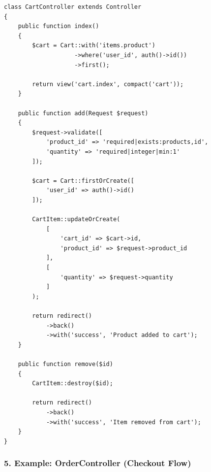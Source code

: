 \documentclass[12pt,a4paper]{article}
\begin{document}
\begin{verbatim}
class CartController extends Controller
{
    public function index()
    {
        $cart = Cart::with('items.product')
                    ->where('user_id', auth()->id())
                    ->first();

        return view('cart.index', compact('cart'));
    }

    public function add(Request $request)
    {
        $request->validate([
            'product_id' => 'required|exists:products,id',
            'quantity' => 'required|integer|min:1'
        ]);

        $cart = Cart::firstOrCreate([
            'user_id' => auth()->id()
        ]);

        CartItem::updateOrCreate(
            [
                'cart_id' => $cart->id,
                'product_id' => $request->product_id
            ],
            [
                'quantity' => $request->quantity
            ]
        );

        return redirect()
            ->back()
            ->with('success', 'Product added to cart');
    }

    public function remove($id)
    {
        CartItem::destroy($id);

        return redirect()
            ->back()
            ->with('success', 'Item removed from cart');
    }
}
\end{verbatim}

\subsubsection{5. Example: OrderController (Checkout Flow)}
\end{document}
